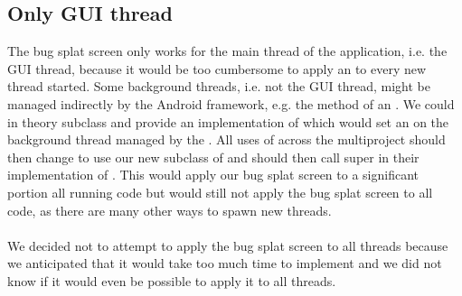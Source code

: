 \subsection{Only GUI thread} 
The bug splat screen only works for the main thread of the application, i.e. the GUI thread, because it would be too cumbersome to apply an  to every new thread started. Some background threads, i.e. not the GUI thread, might be managed indirectly by the Android framework, e.g. the  method of an . We could in theory subclass  and provide an implementation of  which would set an  on the background thread managed by the . All uses of  across the \giraf multiproject should then change to use our new subclass of  and should then call super in their implementation of . This would apply our bug splat screen to a significant portion all running code but would still not apply the bug splat screen to all code, as there are many other ways to spawn new threads. 
\\\\
We decided not to attempt to apply the bug splat screen to all threads because we anticipated that it would take too much time to implement and we did not know if it would even be possible to apply it to all threads.        


